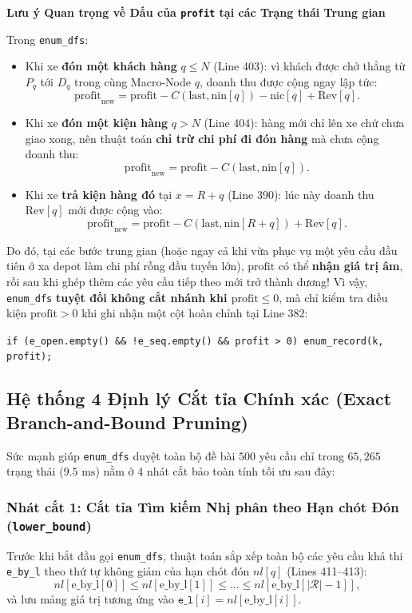 \documentclass[11pt,a4paper]{article}
\theoremstyle{definition}
\newenvironment{warnbox}[1]{%
    \par\medskip\noindent
    \begin{lrbox}{\calloutbox}%
    \begin{minipage}{\dimexpr\linewidth-2\fboxsep-2\fboxrule\relax}
    \textbf{\textcolor{accentred}{#1}}\par\smallskip
}{%
    \end{minipage}%
    \end{lrbox}%
    \fcolorbox{borderamber}{softamber}{\usebox{\calloutbox}}%
    \par\medskip
}
\begin{document}
\begin{warnbox}{Lưu ý Quan trọng về Dấu của \texttt{profit} tại các Trạng thái Trung gian}
Trong \texttt{enum\_dfs}:
\begin{itemize}[leftmargin=1.2em]
    \item Khi xe \textbf{đón một khách hàng} $q \le N$ (Line 403): vì khách được chở thẳng từ $P_q$ tới $D_q$ trong cùng Macro-Node $q$, doanh thu được cộng ngay lập tức:
    \[
        \text{profit}_{\text{new}} = \text{profit} - C(\text{last}, \text{nin}[q]) - \text{nic}[q] + \text{Rev}[q].
    \]
    \item Khi xe \textbf{đón một kiện hàng} $q > N$ (Line 404): hàng mới chỉ lên xe chứ chưa giao xong, nên thuật toán \textbf{chỉ trừ chi phí đi đón hàng} mà chưa cộng doanh thu:
    \[
        \text{profit}_{\text{new}} = \text{profit} - C(\text{last}, \text{nin}[q]).
    \]
    \item Khi xe \textbf{trả kiện hàng đó} tại $x = R + q$ (Line 390): lúc này doanh thu $\text{Rev}[q]$ mới được cộng vào:
    \[
        \text{profit}_{\text{new}} = \text{profit} - C(\text{last}, \text{nin}[R+q]) + \text{Rev}[q].
    \]
\end{itemize}
Do đó, tại các bước trung gian (hoặc ngay cả khi vừa phục vụ một yêu cầu đầu tiên ở xa depot làm chi phí rỗng đầu tuyến lớn), $\text{profit}$ có thể \textbf{nhận giá trị âm}, rồi sau khi ghép thêm các yêu cầu tiếp theo mới trở thành dương! Vì vậy, \texttt{enum\_dfs} \textbf{tuyệt đối không cắt nhánh khi $\text{profit} \le 0$}, mà chỉ kiểm tra điều kiện $\text{profit} > 0$ khi ghi nhận một cột hoàn chỉnh tại Line 382:
\begin{center}
    \texttt{if (e\_open.empty() \&\& !e\_seq.empty() \&\& profit > 0) enum\_record(k, profit);}
\end{center}
\end{warnbox}

\subsection{Hệ thống 4 Định lý Cắt tỉa Chính xác (Exact Branch-and-Bound Pruning)}
Sức mạnh giúp \texttt{enum\_dfs} duyệt toàn bộ đề bài $500$ yêu cầu chỉ trong $65,265$ trạng thái ($9.5\text{ ms}$) nằm ở 4 nhát cắt bảo toàn tính tối ưu sau đây:

\subsubsection{Nhát cắt 1: Cắt tỉa Tìm kiếm Nhị phân theo Hạn chót Đón (\texttt{lower\_bound})}
Trước khi bắt đầu gọi \texttt{enum\_dfs}, thuật toán sắp xếp toàn bộ các yêu cầu khả thi \texttt{e\_by\_l} theo thứ tự không giảm của hạn chót đón $nl[q]$ (Lines 411--413):
\[
    nl[\text{e\_by\_l}[0]] \le nl[\text{e\_by\_l}[1]] \le \dots \le nl[\text{e\_by\_l}[|\mathcal{R}|-1]],
\]
và lưu mảng giá trị tương ứng vào $\texttt{e\_l}[i] = nl[\text{e\_by\_l}[i]]$.
\end{document}
